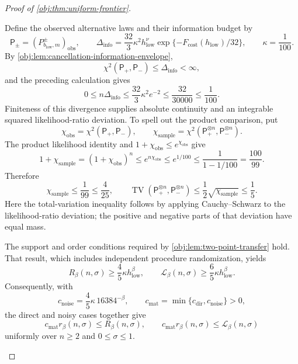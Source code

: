 \documentclass[11pt]{article}
\begin{document}
\begin{proof}[Proof of \cref{obj:thm:uniform-frontier}]
\begin{enumerate}
Define the observed alternative laws and their information budget by
\[
\mathsf P_\pm=(P^\pm_{b_{\mathrm{low}},m})_{\mathrm{obs}},
\qquad
\Delta_{\mathrm{info}}
=\frac{32}{3}\kappa^2h_{\mathrm{low}}^\nu
 \exp\{-F_{\mathrm{cost}}(h_{\mathrm{low}})/32\},
\qquad
\kappa=\frac1{100}.
\]
By \cref{obj:lem:cancellation-information-envelope},
\[
\chi^2(\mathsf P_+,\mathsf P_-)\le\Delta_{\mathrm{info}}<\infty,
\]
and the preceding calculation gives
\[
0\le n\Delta_{\mathrm{info}}
\le\frac{32}{3}\kappa^2e^{-2}
\le\frac{32}{30000}
\le\frac1{100}.
\]
Finiteness of this divergence supplies absolute continuity and an integrable
squared likelihood-ratio deviation. To spell out the product comparison, put
\[
\chi_{\mathrm{obs}}=\chi^2(\mathsf P_+,\mathsf P_-),
\qquad
\chi_{\mathrm{sample}}
=\chi^2(\mathsf P_+^{\otimes n},\mathsf P_-^{\otimes n}).
\]
The product likelihood identity and \(1+\chi_{\mathrm{obs}}\le e^{\chi_{\mathrm{obs}}}\) give
\[
1+\chi_{\mathrm{sample}}
=(1+\chi_{\mathrm{obs}})^n
\le e^{n\chi_{\mathrm{obs}}}
\le e^{1/100}
\le\frac1{1-1/100}
=\frac{100}{99}.
\]
Therefore
\[
\chi_{\mathrm{sample}}\le\frac1{99}\le\frac4{25},
\qquad
\operatorname{TV}(\mathsf P_+^{\otimes n},\mathsf P_-^{\otimes n})
\le\frac12\sqrt{\chi_{\mathrm{sample}}}
\le\frac15.
\]
Here the total-variation inequality follows by applying Cauchy--Schwarz to
the likelihood-ratio deviation; the positive and negative parts of that
deviation have equal mass.

The support and order conditions required by
\cref{obj:lem:two-point-transfer} hold. That result, which includes independent
procedure randomization, yields
\[
R_\beta(n,\sigma)\ge\frac45\kappa h_{\mathrm{low}}^\beta,
\qquad
\mathcal L_\beta(n,\sigma)\ge\frac65\kappa h_{\mathrm{low}}^\beta.
\]
Consequently, with
\[
c_{\mathrm{noise}}=\frac45\kappa\,16384^{-\beta},
\qquad
c_{\mathrm{mat}}=\min\{c_{\mathrm{dir}},c_{\mathrm{noise}}\}>0,
\]
the direct and noisy cases together give
\[
c_{\mathrm{mat}}r_\beta(n,\sigma)\le R_\beta(n,\sigma),
\qquad
c_{\mathrm{mat}}r_\beta(n,\sigma)\le\mathcal L_\beta(n,\sigma)
\]
uniformly over \(n\ge2\) and \(0\le\sigma\le1\).


\end{enumerate}
\end{proof}
\end{document}
